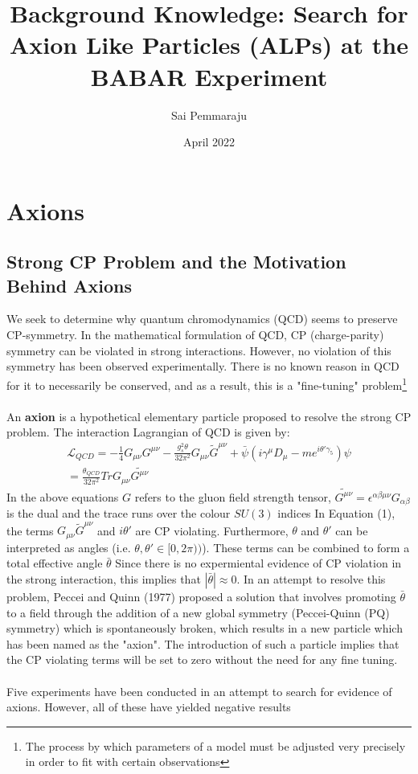 \documentclass{article}
\title{\textbf{Background Knowledge: Search for Axion Like Particles (ALPs) at the BABAR Experiment}}
\author{Sai Pemmaraju}
\date{April 2022}
\begin{document}
\maketitle

\section{Axions}
\subsection{Strong CP Problem and the Motivation Behind Axions}
We seek to determine why quantum chromodynamics (QCD) seems to preserve CP-symmetry. In the mathematical formulation of QCD, CP (charge-parity) symmetry can be violated in strong interactions.
However, no violation of this symmetry has been observed experimentally. There is no known reason in QCD for it to necessarily be conserved, and as a result, this is a "fine-tuning" problem\footnote{The process by which parameters of a model must be adjusted very precisely in order to fit with certain observations}\\
\\
An \textbf{axion} is a hypothetical elementary particle proposed to 
resolve the strong CP problem. The interaction Lagrangian of QCD is given by:
\begin{eqnarray}
    \mathcal{L}_{QCD} = -\frac{1}{4}G_{\mu\nu}G^{\mu\nu}-\frac{g_{s}^{2}\theta}{32\pi^{2}}G_{\mu\nu}\tilde{G}^{\mu\nu}+\bar{\psi}(i\gamma^{\mu}D_{\mu}-me^{i\theta'\gamma_{5}})\psi\\
    = \frac{\theta_{QCD}}{32\pi^{2}} Tr G_{\mu\nu}\tilde{G^{\mu\nu}}
\end{eqnarray}
In the above equations $G$ refers to the gluon field strength tensor, $\tilde{G^{\mu\nu}} = \epsilon^{\alpha\beta\mu\nu}G_{\alpha\beta}$ is the dual and the trace runs over the colour $SU(3)$ indices
In Equation (1), the terms $G_{\mu\nu}\tilde{G}^{\mu\nu}$ and $i\theta'$ are CP violating. Furthermore, $\theta$ and $\theta'$ can be interpreted as angles (i.e. $\theta, \theta'\in[0,2\pi))$). These terms can be combined to form a total effective angle $\bar{\theta}$
Since there is no expermiental evidence of CP violation in the strong interaction, this implies that $|\bar{\theta}|\approx 0$. In an attempt to resolve this problem, Peccei and Quinn (1977) proposed a solution that involves promoting $\bar{\theta}$ to a field through the addition of 
a new global symmetry (Peccei-Quinn (PQ) symmetry) which is spontaneously broken, which results in a new particle which has been named as the "axion". The introduction of such a particle implies that the CP violating terms will be set to zero without the need for any fine tuning.\\
\\
Five experiments have been conducted in an attempt to search for evidence of axions. However, all of these have yielded negative results
\end{document}
